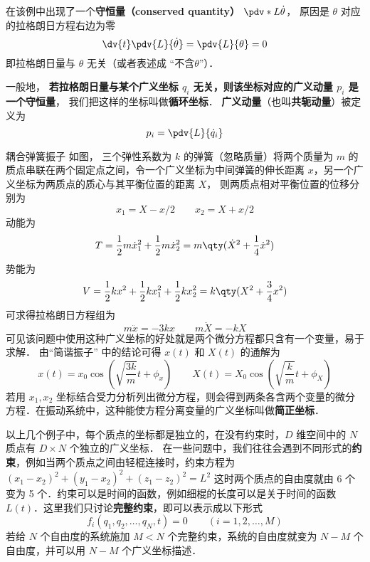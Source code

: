 在该例中出现了一个\textbf{守恒量（conserved quantity）} $\pdv*{L}{\dot\theta}$， 原因是 $\theta$ 对应的拉格朗日方程右边为零
\begin{equation}
\dv{t}\pdv{L}{\dot\theta} = \pdv{L}{\theta} = 0
\end{equation}
即拉格朗日量与 $\theta$ 无关（或者表述成 “不含$\theta$”）．

一般地， \textbf{若拉格朗日量与某个广义坐标 $q_i$ 无关，则该坐标对应的广义动量 $p_i$ 是一个守恒量}， 我们把这样的坐标叫做\textbf{循环坐标}． \textbf{广义动量}（也叫\textbf{共轭动量}）被定义为
\begin{equation}\label{Lagrng_eq13}
p_i = \pdv{L}{\dot q_i}
\end{equation}

\begin{example}{耦合弹簧振子}
如图，%
三个弹性系数为 $k$ 的弹簧（忽略质量）将两个质量为 $m$ 的质点串联在两个固定点之间，令一个广义坐标为中间弹簧的伸长距离 $x$，另一个广义坐标为两质点的质心与其平衡位置的距离 $X$， 则两质点相对平衡位置的位移分别为
\begin{equation}
x_1=X-x/2 \qquad x_2 = X+x/2
\end{equation}
动能为
\begin{equation}
T=\frac12 m\dot x_1^2 + \frac12 m\dot x_2^2 = m \qty(\dot X^2 + \frac14 \dot x^2)
\end{equation}
势能为
\begin{equation}
V = \frac12 k x^2 + \frac12 kx_1^2 + \frac12 k x_2^2 = k\qty(X^2 + \frac34 x^2)
\end{equation}
可求得拉格朗日方程组为
\begin{equation}
m\ddot x =  - 3kx \qquad m\ddot X =  - kX
\end{equation}
可见该问题中使用这种广义坐标的好处就是两个微分方程都只含有一个变量，易于求解． 由“简谐振子” 中的结论可得 $x(t)$ 和 $X(t)$ 的通解为
\begin{equation}
x(t) = x_0 \cos(\sqrt{\frac{3k}{m}} t + \phi_x)
\qquad
X(t) = X_0 \cos(\sqrt{\frac{k}{m}} t + \phi_X)
\end{equation}
若用 $x_1, x_2$ 坐标结合受力分析列出微分方程，则会得到两条各含两个变量的微分方程．在振动系统中，这种能使方程分离变量的广义坐标叫做\textbf{简正坐标}．%
\end{example}

以上几个例子中，每个质点的坐标都是独立的，在没有约束时，$D$ 维空间中的 $N$ 质点有 $D\times N$ 个独立的广义坐标． 在一些问题中，我们往往会遇到不同形式的\textbf{约束}，例如当两个质点之间由轻棍连接时，约束方程为 $(x_1-x_2)^2+(y_1-x_2)^2+(z_1-z_2)^2=L^2$ 这时两个质点的自由度就由 6 个变为 5 个．约束可以是时间的函数，例如细棍的长度可以是关于时间的函数 $L(t)$．这里我们只讨论\textbf{完整约束}，即可以表示成以下形式
\begin{equation}
f_i(q_1,q_2,\dots ,q_N,t) = 0 \qquad (i = 1,2,\dots,M)
\end{equation}
若给 $N$ 个自由度的系统施加 $M<N$ 个完整约束，系统的自由度就变为 $N-M$ 个自由度，并可以用 $N-M$ 个广义坐标描述．

